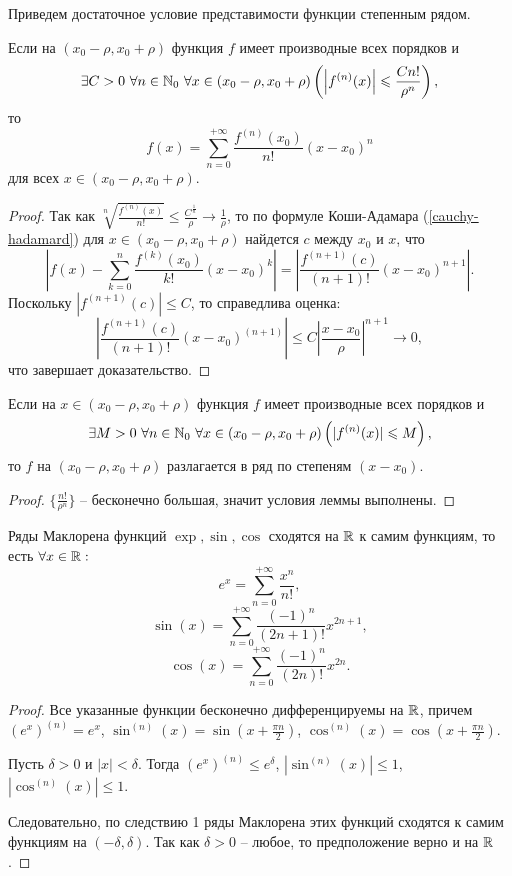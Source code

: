 Приведем достаточное условие представимости функции степенным рядом.

\begin{lemma}
    Если на $(x_{0} - \rho, x_{0} + \rho)$ функция $f$ имеет производные всех порядков и 
    \[\exists C > 0 \ \forall n \in \mathbb{N}_{0} \ \forall x \in (x_{0} - \rho, x_{0} + \rho) \left(\left|f^{(n)}(x)\right| \leqslant \frac{C n!}{\rho^{n}}\right),\]
    то 
    \[f(x) = \sum_{n = 0}^{+\infty} \frac{f^{(n)}(x_{0})}{n!}(x - x_{0})^{n}\]
    для всех $x \in (x_{0} - \rho, x_{0} + \rho)$.
\end{lemma}

\begin{proof}
    Так как $\sqrt[n]{\frac{f^{(n)}(x)}{n!}} \leq \frac{C^{\frac{1}{n}}}{\rho} \to \frac{1}{\rho}$, то по формуле Коши-Адамара (\ref{cauchy-hadamard}) для $x \in (x_{0} - \rho, x_{0} + \rho)$ найдется $c$ между $x_{0}$ и $x$, что
    \[\left|f(x) - \sum_{k = 0}^{n}\frac{f^{(k)}(x_{0})}{k!}(x - x_{0})^{k}\right| = \left|\frac{f^{(n + 1)}(c)}{(n + 1)!}(x - x_{0})^{n + 1}\right|.\]
    Поскольку $|f^{(n + 1)}(c)| \leq C$, то справедлива оценка:
    \[\left|\frac{f^{(n + 1)}(c)}{(n + 1)!}(x - x_{0})^{(n + 1)}\right| \leq C\left|\frac{x - x_{0}}{\rho}\right|^{n + 1} \to 0,\]
    что завершает доказательство.
\end{proof}

\begin{corollary}
    Если на $x \in (x_{0} - \rho, x_{0} + \rho)$ функция $f$ имеет производные всех порядков и 
    \[\exists M > 0 \ \forall n \in \mathbb{N}_{0} \ \forall x \in (x_{0} - \rho, x_{0} + \rho) \left(|f^{(n)}(x)| \leqslant M\right),\]
    то $f$ на $(x_{0} - \rho, x_{0} + \rho)$ разлагается в ряд по степеням $(x - x_{0})$.
\end{corollary}

\begin{proof}
    $\{\frac{n!}{\rho^{n}}\}$ -- бесконечно большая, значит условия леммы выполнены.
\end{proof}

\begin{corollary}
    Ряды Маклорена функций $\exp, \sin, \cos$ сходятся на $\mathbb{R}$ к самим функциям, то есть $\forall x \in \mathbb{R}:$
    \[e^{x} = \sum_{n = 0}^{+\infty} \frac{x^{n}}{n!},\]
    \[\sin(x) = \sum_{n = 0}^{+\infty} \frac{(-1)^{n}}{(2n+1)!}x^{2n + 1},\]
    \[\cos(x) = \sum_{n = 0}^{+\infty} \frac{(-1)^{n}}{(2n)!}x^{2n}.\]
\end{corollary}

\begin{proof}
    Все указанные функции бесконечно дифференцируемы на $\mathbb{R}$, причем $(e^x)^{(n)} = e^x$, $\sin^{(n)}(x) = \sin(x + \frac{\pi n}{2})$, $\cos^{(n)}(x) = \cos(x + \frac{\pi n}{2})$.

    Пусть $\delta > 0$ и $|x| < \delta$. Тогда $(e^x)^{(n)} \leq e^{\delta}$, $|\sin^{(n)}(x)| \leq 1$, $|\cos^{(n)}(x)| \leq 1$.

    Следовательно, по следствию 1 ряды Маклорена этих функций сходятся к самим функциям на $(-\delta, \delta)$. Так как $\delta > 0$ -- любое, то предположение верно и на $\mathbb{R}$.
\end{proof}

